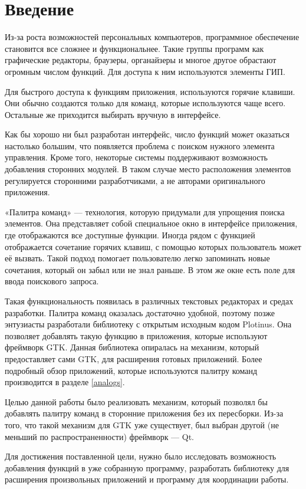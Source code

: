 \chapter*{Введение}

Из-за роста возможностей персональных компьютеров, программное обеспечение
становится все сложнее и функциональнее. Такие группы программ как графические
редакторы, браузеры, органайзеры и многое другое обрастают
огромным числом функций. Для доступа к ним используются элементы ГИП.

Для быстрого доступа к функциям приложения, используются горячие клавиши. Они
обычно создаются только для команд, которые используются чаще всего. Остальные
же приходится выбирать вручную в интерфейсе.

Как бы хорошо ни был разработан интерфейс, число функций может оказаться
настолько большим, что появляется проблема с поиском нужного элемента
управления. Кроме того, некоторые системы поддерживают возможность добавления
сторонних модулей. В таком случае место расположения элементов регулируется
сторонними разработчиками, а не авторами оригинального приложения.

«Палитра команд» — технология, которую придумали для упрощения поиска элементов.
Она представляет собой специальное окно в интерфейсе приложения, где
отображаются все доступные функции. Иногда рядом с функцией отображается
сочетание горячих клавиш, с помощью которых пользователь может её вызвать. Такой
подход помогает пользователю легко запоминать новые сочетания, который он забыл
или не знал раньше.  В этом же окне есть поле для ввода поискового запроса.

Такая функциональность появилась в различных текстовых редакторах и
средах разработки. Палитра команд оказалась достаточно удобной, поэтому позже
энтузиасты разработали библиотеку с открытым исходным кодом Plotinus. Она
позволяет добавлять такую функцию в приложения, которые используют фреймворк
GTK. Данная библиотека опиралась на механизм, который предоставляет сами GTK,
для расширения готовых приложений. Более подробный обзор приложений,
которые используются палитру команд производится в разделе \ref{analogs}.

Целью данной работы было реализовать механизм, который позволял бы добавлять
палитру команд в сторонние приложения без их пересборки. Из-за того, что такой
механизм для GTK уже существует, был выбран другой (не меньший по
распространенности) фреймворк — Qt.

Для достижения поставленной цели, нужно было исследовать возможность
добавления функций в уже собранную программу, разработать библиотеку для
расширения произвольных приложений и программу для координации работы.


